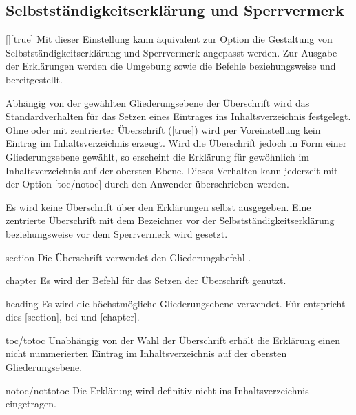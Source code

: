 \subsection{Selbstständigkeitserklärung und Sperrvermerk}
\begin{Declaration}{[\PSet]}[true]%
\printdeclarationlist%
%
%
Mit dieser Einstellung kann äquivalent zur Option  die 
Gestaltung von Selbstständigkeitserklärung und Sperrvermerk angepasst werden.
Zur Ausgabe der Erklärungen werden die Umgebung  
sowie die Befehle  beziehungsweise  und 
 bereitgestellt. 

Abhängig von der gewählten Gliederungsebene der Überschrift wird das 
Standardverhalten für das Setzen eines Eintrages ins Inhaltsverzeichnis 
festgelegt. Ohne oder mit zentrierter Überschrift ([true]) 
wird per Voreinstellung kein Eintrag im Inhaltsverzeichnis erzeugt. Wird die 
Überschrift jedoch in Form einer Gliederungsebene gewählt, so erscheint die 
Erklärung für gewöhnlich im Inhaltsverzeichnis auf der obersten Ebene. Dieses 
Verhalten kann jederzeit mit der Option [toc/notoc] durch 
den Anwender überschrieben werden.
%
\begin{values}
\itemfalse
  Es wird keine Überschrift über den Erklärungen selbst ausgegeben.
\itemtrue*
  Eine zentrierte Überschrift mit dem Bezeichner  vor 
  der Selbstständigkeitserklärung beziehungsweise  vor dem 
  Sperrvermerk wird gesetzt. 
\item[section]
  Die Überschrift verwendet den Gliederungsbefehl .
\item[chapter]
  Es wird der Befehl  für das Setzen der Überschrift genutzt. 
\item[heading]
  Es wird die höchstmögliche Gliederungsebene verwendet. Für 
   entspricht dies [section], bei 
   und  [chapter].
\item[toc/totoc]
  Unabhängig von der Wahl der Überschrift erhält die Erklärung einen nicht
  nummerierten Eintrag im Inhaltsverzeichnis auf der obersten Gliederungsebene. 
\item[notoc/nottotoc]
  Die Erklärung wird definitiv nicht ins Inhaltsverzeichnis eingetragen.

\end{values}
\end{Declaration}
